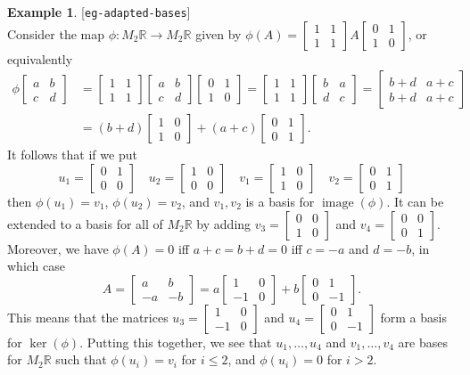 \documentclass{amsart}
\newcommand{\lbl}[1]{\label{#1}\textup{[\texttt{#1}]}\ \\}
\newcommand{\lbl}{\label}
\newcommand{\R}         {{\mathbb{R}}}
\newcommand{\img}       {\operatorname{image}}
\newcommand{\bsm}       {\left[\begin{smallmatrix}}
\newcommand{\esm}       {\end{smallmatrix}\right]}
\renewcommand{\:}       {\colon}
\theoremstyle{definition}
\newtheorem{example}[theorem]{Example}
\begin{document}
\begin{example}\lbl{eg-adapted-bases}
 Consider the map $\phi\:M_2\R\to M_2\R$ given by 
 $\phi(A)=\bsm 1&1\\1&1\esm A\bsm 0&1\\1&0\esm$, or equivalently 
 \begin{align*}
  \phi\bsm a&b\\ c&d\esm
   &= \bsm 1&1\\1&1\esm \bsm a&b\\ c&d\esm \bsm 0&1\\1&0\esm
    = \bsm 1&1\\1&1\esm \bsm b&a\\ d&c\esm
    = \bsm b+d & a+c\\ b+d & a+c \esm \\
   &= (b+d) \bsm 1&0\\1&0\esm + (a+c)\bsm 0&1\\0&1\esm.
 \end{align*}
 It follows that if we put
 \[ u_1=\bsm 0&1\\0&0\esm\hspace{1em}
    u_2=\bsm 1&0\\0&0\esm\hspace{1em}
    v_1=\bsm 1&0\\1&0\esm\hspace{1em}
    v_2=\bsm 0&1\\0&1\esm
 \]
 then $\phi(u_1)=v_1$, $\phi(u_2)=v_2$, and $v_1,v_2$ is a basis
 for $\img(\phi)$.  It can be extended to a basis for all of
 $M_2\R$ by adding $v_3=\bsm 0&0\\1&0\esm$ and $v_4=\bsm 0&0\\0&1\esm$.
 Moreover, we have $\phi(A)=0$ iff $a+c=b+d=0$ iff
 $c=-a$ and $d=-b$, in which case 
 \[ A = \bsm a & b \\ -a & -b \esm = 
      a\bsm 1&0\\-1&0\esm + b\bsm 0&1\\0&-1\esm.
 \]
 This means that the matrices $u_3=\bsm 1&0\\-1&0\esm$ and
 $u_4=\bsm 0&1\\0&-1\esm$ form a basis for $\ker(\phi)$. 
 Putting this together, we see that $u_1,\dotsc,u_4$ and
 $v_1,\dotsc,v_4$ are bases for $M_2\R$ such that $\phi(u_i)=v_i$
 for $i\leq 2$, and $\phi(u_i)=0$ for $i>2$.
\end{example}
\end{document}
